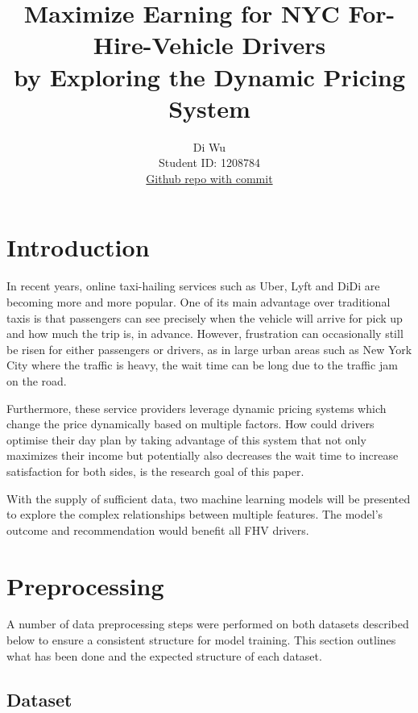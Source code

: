 \documentclass[11pt]{article}
\title{\textbf{Maximize Earning for NYC For-Hire-Vehicle Drivers} \\ by Exploring the Dynamic Pricing System}
\author{
Di Wu \\
Student ID: 1208784 \\
\href{https://github.com/MAST30034-Applied-Data-Science/mast30034-project-1-WD1120}{Github repo with commit}
}
\begin{document}
\maketitle

\section{Introduction}

In recent years, online taxi-hailing services such as Uber, Lyft and DiDi are becoming more and more popular. One of its main advantage over traditional taxis is that passengers can see precisely when the vehicle will arrive for pick up and how much the trip is, in advance. However, frustration can occasionally still be risen for either passengers or drivers, as in large urban areas such as New York City where the traffic is heavy, the wait time can be long due to the traffic jam on the road. 

Furthermore, these service providers leverage dynamic pricing systems which change the price dynamically based on multiple factors. How could drivers optimise their day plan by taking advantage of this system that not only maximizes their income but potentially also decreases the wait time to increase satisfaction for both sides, is the research goal of this paper. 

With the supply of sufficient data, two machine learning models will be presented to explore the complex relationships between multiple features. The model's outcome and recommendation would benefit all FHV drivers. 


\section{Preprocessing}

A number of data preprocessing steps were performed on both datasets described below to ensure a consistent structure for model training. This section outlines what has been done and the expected structure of each dataset. 

\subsection{Dataset}
\end{document}
